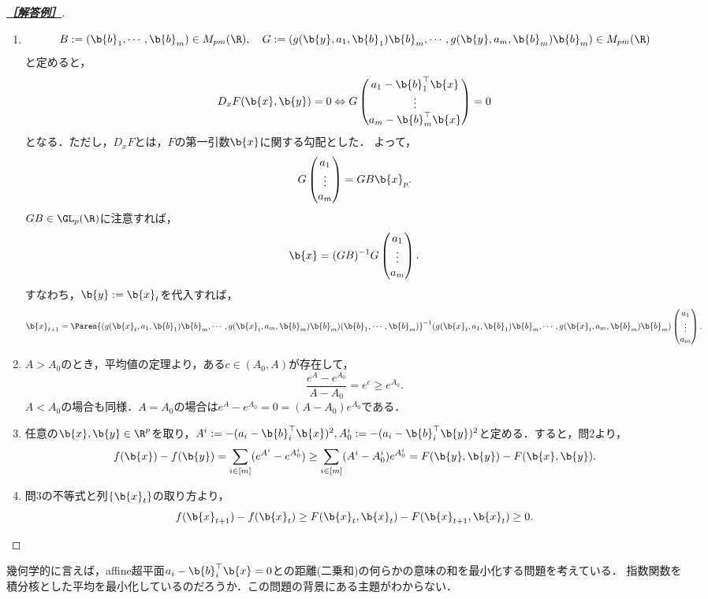 \documentclass[uplatex,dvipdfmx]{jsarticle}
\begin{document}
\begin{proof}[\textbf{\underline{［解答例］}}]\mbox{}
    \begin{enumerate}
        \item \[B:=(\b{b}_1,\cdots,\b{b}_m)\in M_{pm}(\R),\quad G:=(g(\b{y},a_1,\b{b}_1)\b{b}_m,\cdots,g(\b{y},a_m,\b{b}_m)\b{b}_m)\in M_{pm}(\R)\]
        と定めると，
        \[D_xF(\b{x},\b{y})=0\Leftrightarrow G \begin{pmatrix}a_1-\b{b}_1^\top\b{x}\\\vdots\\a_m-\b{b}_m^\top\b{x}\end{pmatrix}=0\]
        となる．ただし，$D_xF$とは，$F$の第一引数$\b{x}$に関する勾配とした．
        よって，
        \[G \begin{pmatrix}a_1\\\vdots\\a_m\end{pmatrix}=GB\b{x}_p.\]
        $GB\in\GL_p(\R)$に注意すれば，
        \[\b{x}=(GB)^{-1}G \begin{pmatrix}a_1\\\vdots\\a_m\end{pmatrix}.\]
        すなわち，$\b{y}:=\b{x}_t$を代入すれば，
        \[\b{x}_{t+1}=\Paren{(g(\b{x}_t,a_1,\b{b}_1)\b{b}_m,\cdots,g(\b{x}_t,a_m,\b{b}_m)\b{b}_m)(\b{b}_1,\cdots,\b{b}_m)}^{-1}(g(\b{x}_t,a_1,\b{b}_1)\b{b}_m,\cdots,g(\b{x}_t,a_m,\b{b}_m)\b{b}_m)\begin{pmatrix}a_1\\\vdots\\a_m\end{pmatrix}.\]
        \item $A>A_0$のとき，平均値の定理より，ある$c\in(A_0,A)$が存在して，
        \[\frac{e^A-e^{A_0}}{A-A_0}=e^c\ge e^{A_0}.\]
        $A<A_0$の場合も同様．$A=A_0$の場合は$e^A-e^{A_0}=0=(A-A_0)e^{A_0}$である．
        \item 任意の$\b{x},\b{y}\in\R^p$を取り，$A^i:=-(a_i-\b{b}_i^\top\b{x})^2,A_0^i:=-(a_i-\b{b}_i^\top\b{y})^2$と定める．すると，問2より，
        \[f(\b{x})-f(\b{y})=\sum_{i\in[m]}(e^{A^i}-e^{A_0^i})\ge\sum_{i\in[m]}(A^i-A_0^i)e^{A_0^i}=F(\b{y},\b{y})-F(\b{x},\b{y}).\]
        \item 問3の不等式と列$\{\b{x}_t\}$の取り方より，
        \[f(\b{x}_{t+1})-f(\b{x}_{t})\ge F(\b{x}_t,\b{x}_t)-F(\b{x}_{t+1},\b{x}_t)\ge0.\]
    \end{enumerate}
\end{proof}
\begin{remarks}
    幾何学的に言えば，affine超平面$a_i-\b{b}_i^\top\b{x}=0$との距離(二乗和)の何らかの意味の和を最小化する問題を考えている．
    指数関数を積分核とした平均を最小化しているのだろうか．この問題の背景にある主題がわからない．
\end{remarks}
\end{document}
